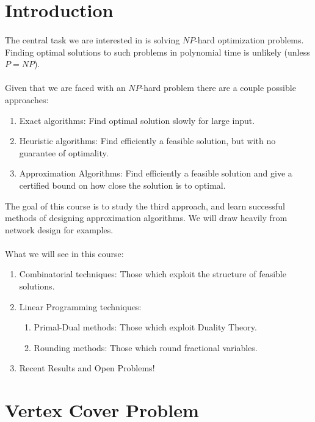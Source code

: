 \documentclass[letterpaper,12pt,oneside,onecolumn]{article}
\begin{document}
\section{Introduction}
\paragraph{}
The central task we are interested in is solving $NP$-hard optimization problems. Finding optimal solutions to such problems in polynomial time is unlikely (unless $P = NP$).

\paragraph{}
Given that we are faced with an $NP$-hard problem there are a couple possible approaches:
\begin{enumerate}
\item Exact algorithms: Find optimal solution slowly for large input.
\item Heuristic algorithms: Find efficiently a feasible solution, but with no guarantee of optimality.
\item Approximation Algorithms: Find efficiently a feasible solution and give a certified bound on how close the solution is to optimal.
\end{enumerate}
The goal of this course is to study the third approach, and learn successful methods of designing approximation algorithms. We will draw heavily from network design for examples.

\paragraph{}
What we will see in this course:
\begin{enumerate}
\item Combinatorial techniques: Those which exploit the structure of feasible solutions.
\item Linear Programming techniques:
\begin{enumerate}
\item Primal-Dual methods: Those which exploit Duality Theory.
\item Rounding methods: Those which round fractional variables.
\end{enumerate}
\item Recent Results and Open Problems!
\end{enumerate}
\section{Vertex Cover Problem}
\end{document}
